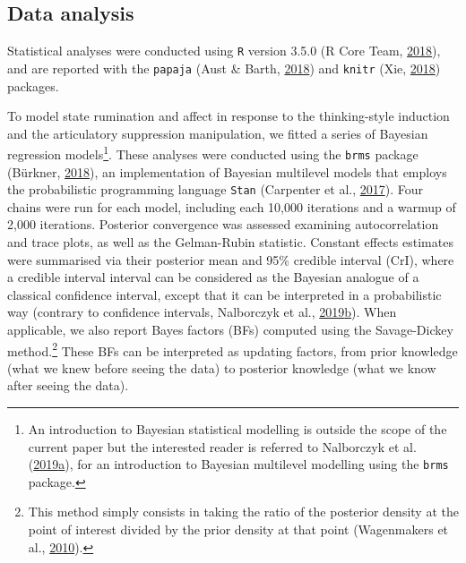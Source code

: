 \documentclass[a4paper,12pt,twoside,openright,oldfontcommands]{memoir}
\let\rmarkdownfootnote\footnote%
\def\footnote{\protect\rmarkdownfootnote}
\begin{document}
\hypertarget{data-analysis-3}{%
\subsection{Data analysis}\label{data-analysis-3}}

Statistical analyses were conducted using \texttt{R} version 3.5.0 (R Core Team, \protect\hyperlink{ref-R-base}{2018}), and are reported with the \texttt{papaja} (Aust \& Barth, \protect\hyperlink{ref-R-papaja}{2018}) and \texttt{knitr} (Xie, \protect\hyperlink{ref-R-knitr}{2018}) packages.

To model state rumination and affect in response to the thinking-style induction and the articulatory suppression manipulation, we fitted a series of Bayesian regression models\footnote{An introduction to Bayesian statistical modelling is outside the scope of the current paper but the interested reader is referred to Nalborczyk et al. (\protect\hyperlink{ref-nalborczyk_introduction_2019}{2019}\protect\hyperlink{ref-nalborczyk_introduction_2019}{a}), for an introduction to Bayesian multilevel modelling using the \texttt{brms} package.}. These analyses were conducted using the \texttt{brms} package (Bürkner, \protect\hyperlink{ref-R-brms}{2018}), an implementation of Bayesian multilevel models that employs the probabilistic programming language \texttt{Stan} (Carpenter et al., \protect\hyperlink{ref-carpenter_stan_2017}{2017}). Four chains were run for each model, including each 10,000 iterations and a warmup of 2,000 iterations. Posterior convergence was assessed examining autocorrelation and trace plots, as well as the Gelman-Rubin statistic. Constant effects estimates were summarised via their posterior mean and 95\% credible interval (CrI), where a credible interval interval can be considered as the Bayesian analogue of a classical confidence interval, except that it can be interpreted in a probabilistic way (contrary to confidence intervals, Nalborczyk et al., \protect\hyperlink{ref-nalborczyk_pragmatism_2019}{2019}\protect\hyperlink{ref-nalborczyk_pragmatism_2019}{b}). When applicable, we also report Bayes factors (BFs) computed using the Savage-Dickey method.\footnote{This method simply consists in taking the ratio of the posterior density at the point of interest divided by the prior density at that point (Wagenmakers et al., \protect\hyperlink{ref-wagenmakers_bayesian_2010}{2010}).} These BFs can be interpreted as updating factors, from prior knowledge (what we knew before seeing the data) to posterior knowledge (what we know after seeing the data).
\end{document}
